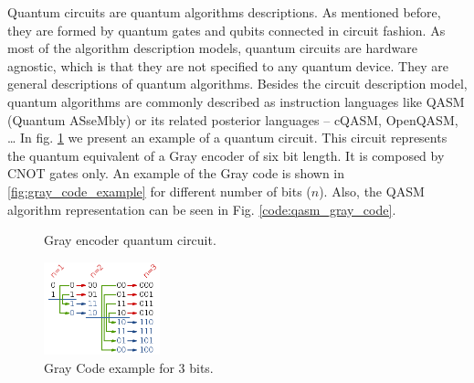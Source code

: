 Quantum circuits are quantum algorithms descriptions.
As mentioned before, they are formed by quantum gates and qubits connected in circuit fashion.
As most of the algorithm description models, quantum circuits are hardware agnostic, which is that they are not specified to any quantum device.
They are general descriptions of quantum algorithms.
Besides the circuit description model, quantum algorithms are commonly described as instruction languages like QASM (Quantum ASseMbly) \cite{Nielsen_2009} or its related posterior languages -- cQASM, OpenQASM, \ldots{}
In fig. \ref{fig:circuit_example} we present an example of a quantum circuit.
This circuit represents the quantum equivalent of a Gray encoder of six bit length.
It is composed by CNOT gates only.
An example of the Gray code is shown in \ref{fig:gray_code_example} for different number of bits (\(n\)).
Also, the QASM algorithm representation can be seen in Fig. \ref{code:qasm_gray_code}.

\begin{figure}
    \centering


\label{fig:circuit_example}
\caption{Gray encoder quantum circuit.}
\end{figure}

\begin{figure}[htbp]
\centering
\includegraphics[width=0.3\textwidth]{figures/gray_code.png}
\caption{\label{fig:org24603d4}
Gray Code example for 3 bits.}
\end{figure}

